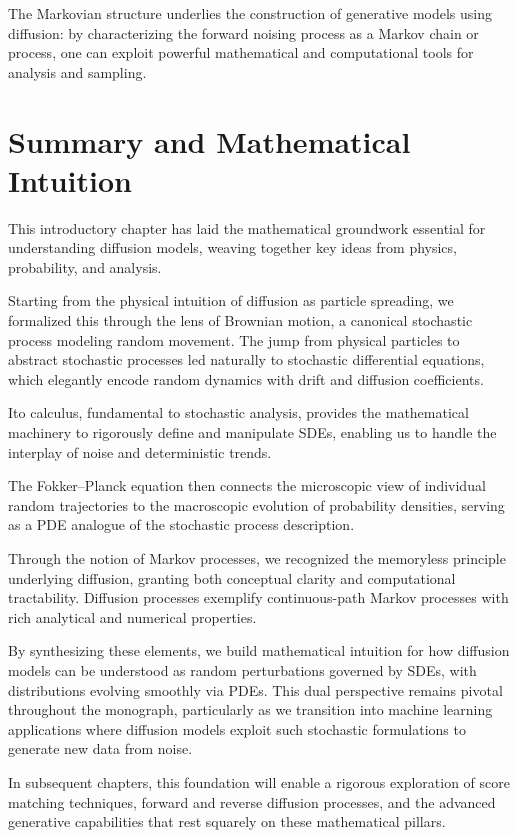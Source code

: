 The Markovian structure underlies the construction of generative models using diffusion: by characterizing the forward noising process as a Markov chain or process, one can exploit powerful mathematical and computational tools for analysis and sampling.

\section{Summary and Mathematical Intuition}

This introductory chapter has laid the mathematical groundwork essential for understanding diffusion models, weaving together key ideas from physics, probability, and analysis.

Starting from the physical intuition of diffusion as particle spreading, we formalized this through the lens of Brownian motion, a canonical stochastic process modeling random movement. The jump from physical particles to abstract stochastic processes led naturally to stochastic differential equations, which elegantly encode random dynamics with drift and diffusion coefficients.

Ito calculus, fundamental to stochastic analysis, provides the mathematical machinery to rigorously define and manipulate SDEs, enabling us to handle the interplay of noise and deterministic trends.

The Fokker--Planck equation then connects the microscopic view of individual random trajectories to the macroscopic evolution of probability densities, serving as a PDE analogue of the stochastic process description.

Through the notion of Markov processes, we recognized the memoryless principle underlying diffusion, granting both conceptual clarity and computational tractability. Diffusion processes exemplify continuous-path Markov processes with rich analytical and numerical properties.

By synthesizing these elements, we build mathematical intuition for how diffusion models can be understood as random perturbations governed by SDEs, with distributions evolving smoothly via PDEs. This dual perspective remains pivotal throughout the monograph, particularly as we transition into machine learning applications where diffusion models exploit such stochastic formulations to generate new data from noise.

In subsequent chapters, this foundation will enable a rigorous exploration of score matching techniques, forward and reverse diffusion processes, and the advanced generative capabilities that rest squarely on these mathematical pillars.

